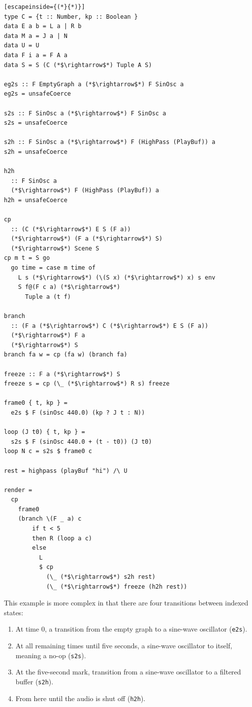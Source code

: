 \documentclass{article}
\begin{document}
\lstset{language=Haskell, style=psstyle}
\begin{lstlisting}[escapeinside={(*}{*)}]
type C = {t :: Number, kp :: Boolean }
data E a b = L a | R b
data M a = J a | N
data U = U
data F i a = F A a
data S = S (C (*$\rightarrow$*) Tuple A S)

eg2s :: F EmptyGraph a (*$\rightarrow$*) F SinOsc a
eg2s = unsafeCoerce

s2s :: F SinOsc a (*$\rightarrow$*) F SinOsc a
s2s = unsafeCoerce

s2h :: F SinOsc a (*$\rightarrow$*) F (HighPass (PlayBuf)) a
s2h = unsafeCoerce

h2h
  :: F SinOsc a
  (*$\rightarrow$*) F (HighPass (PlayBuf)) a
h2h = unsafeCoerce

cp
  :: (C (*$\rightarrow$*) E S (F a))
  (*$\rightarrow$*) (F a (*$\rightarrow$*) S)
  (*$\rightarrow$*) Scene S
cp m t = S go
  go time = case m time of
    L s (*$\rightarrow$*) (\(S x) (*$\rightarrow$*) x) s env
    S f@(F c a) (*$\rightarrow$*)
      Tuple a (t f)

branch
  :: (F a (*$\rightarrow$*) C (*$\rightarrow$*) E S (F a))
  (*$\rightarrow$*) F a
  (*$\rightarrow$*) S
branch fa w = cp (fa w) (branch fa)

freeze :: F a (*$\rightarrow$*) S
freeze s = cp (\_ (*$\rightarrow$*) R s) freeze

frame0 { t, kp } =
  e2s $ F (sinOsc 440.0) (kp ? J t : N))

loop (J t0) { t, kp } =
  s2s $ F (sinOsc 440.0 + (t - t0)) (J t0)
loop N c = s2s $ frame0 c

rest = highpass (playBuf "hi") /\ U

render =
  cp
    frame0
    (branch \(F _ a) c
        if t < 5
        then R (loop a c)
        else
          L
          $ cp
            (\_ (*$\rightarrow$*) s2h rest)
            (\_ (*$\rightarrow$*) freeze (h2h rest))
\end{lstlisting}

This example is more complex in that there are four transitions between indexed states:
\begin{enumerate}
  \item At time 0, a transition from the empty graph to a sine-wave oscillator (\texttt{e2s}).
  \item At all remaining times until five seconds, a sine-wave oscillator to itself, meaning a no-op (\texttt{s2s}).
  \item At the five-second mark, transition from a sine-wave oscillator to a filtered buffer (\texttt{s2h}).
  \item From here until the audio is shut off (\texttt{h2h}).
\end{enumerate}
\end{document}

